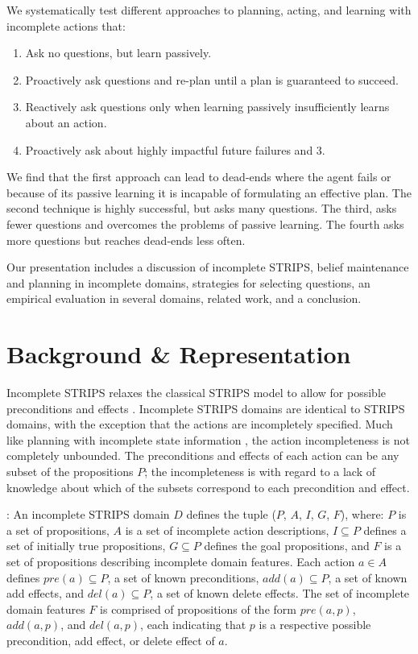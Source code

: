 \documentclass[letterpaper]{article}
\def\und#1{\noindent{\bf #1}:}
\def\citep#1{\cite{#1}}
\begin{document}
We systematically test different approaches to planning, acting, and learning
with incomplete actions that:
\begin{enumerate}
\item Ask no questions, but learn passively. 
\item Proactively ask questions and re-plan until a plan is guaranteed to
succeed.
\item Reactively ask questions only when learning passively insufficiently
learns about an action.
\item  Proactively ask about
highly impactful future failures and 3.
\end{enumerate}
We find that the first approach can lead to dead-ends where the agent fails or
because of its passive learning it is incapable of formulating an effective
plan.  The second technique is highly successful, but asks many questions.  The
third, asks fewer questions and overcomes the problems of passive learning.  The
fourth asks more questions but reaches
dead-ends less often.

Our presentation includes a discussion of incomplete STRIPS, belief maintenance
and planning in incomplete domains, strategies for selecting questions, an empirical evaluation in several domains,
related work, and a conclusion.

\section{Background \& Representation}\label{sec:background}

Incomplete STRIPS relaxes the classical STRIPS model to allow for
possible preconditions and effects \citep{Garland02}.  
Incomplete STRIPS domains are identical to STRIPS domains, with the exception
that the actions are incompletely specified.  Much like planning with incomplete
state information \citep{bonet00planning}, the action incompleteness is not
completely unbounded.  The preconditions and effects of each action can be any
subset of the propositions $P$; the incompleteness is with regard to a lack of
knowledge about which of the subsets correspond to each precondition and effect.        

\und{Incomplete STRIPS Domains} An incomplete STRIPS domain ${D}$  defines the
tuple ($P$, ${A}$, $I$, $G$, $F$), where: $P$ is a  set of propositions, ${A}$
is a set of incomplete  action descriptions, $I \subseteq P$ defines a set of
initially true  propositions, $G \subseteq P$ defines the goal propositions, and
$F$ is a set of propositions describing incomplete domain features. Each action
${a} \in {A}$ defines $pre({a}) \subseteq P$, a set of known preconditions,
$add({a}) \subseteq P$, a set of known add  effects, and $del({a}) \subseteq P$,
a set of known delete effects.   The set of incomplete domain features $F$ is
comprised of propositions of the form $pre({a}, p)$, $add({a}, p)$, and
$del({a}, p)$, each indicating that $p$ is a respective possible precondition, add effect, or
delete effect of $a$.
\end{document}
